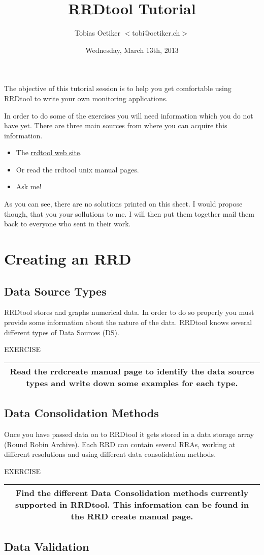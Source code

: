 \documentclass[a4paper,12pt]{article}
\title{RRDtool Tutorial}
\date{Wednesday, March 13th, 2013}
\author{Tobias Oetiker $<$tobi@oetiker.ch$>$}
\newenvironment{work}{\textsf{\tiny EXERCISE}\nopagebreak\\[0.3ex]\begin{tabular}{|c|}
 \hline
 \begin{minipage}{0.965\linewidth}%
 \setlength{\parskip}{1.6ex plus 0.6ex minus 0.4ex}%
 \rule{0pt}{2.8ex}\ignorespaces}
{\rule[-1.8ex]{0pt}{0pt}\end{minipage}\\
 \hline
 \end{tabular}}
\newcommand{\ex}[1]{\subsection{#1}}
\begin{document}
\maketitle

The objective of this tutorial session is to help you get comfortable using
RRDtool to write your own monitoring applications.

In order to do some of the exercises you will need information which
you do not have yet. There are three main sources from where you can
acquire this information.

\begin{itemize}
\item The \href{http://oss.oetiker.ch/rrdtool}{rrdtool web site}.
\item Or read the rrdtool unix manual pages.
\item Ask me!
\end{itemize}

As you can see, there are no solutions printed on this sheet. I would
propose though, that you your sollutions to me. I will then put them together
mail them back to everyone who sent in their work.


\newpage
\section{Creating an RRD}
\ex{Data Source Types}

RRDtool stores and graphs numerical data. In order to do so
properly you must provide some information about the nature of the
data. RRDtool knows several different types of Data Sources (DS).

\begin{work}
  Read the rrdcreate manual page to identify the data source types
  and write down some examples for each type.
\end{work}

\ex{Data Consolidation Methods}

Once you have passed data on to RRDtool it gets stored in a data
storage array (Round Robin Archive). Each RRD can contain several
RRAs, working at different resolutions and using different data
consolidation methods.

\begin{work}
  Find the different Data Consolidation methods currently supported in
  RRDtool. This information can be found in the RRD create manual
  page.
\end{work}

\ex{Data Validation}
\end{document}
